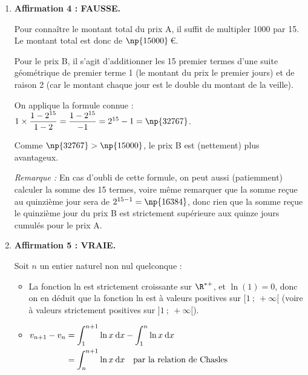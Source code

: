 \begin{enumerate}
	\begin{itemize}
		\item La première exécution \og modifie\fg{} \texttt{U} en \texttt{U + 0}, la valeur reste égale à 1;
		\item La deuxième exécution modifie \texttt{U} en \texttt{U + 1}, la valeur devient égale à $1 + 1 = 2$;
		\item La troisième exécution modifie \texttt{U} en \texttt{U + 2}, la valeur devient égale à $2 + 2 = 4$;
		\item La dernière exécution modifie \texttt{U} en \texttt{U + 3}, la valeur devient égale à $4 + 3 = 7$.
	\end{itemize}

	On a donc bien la valeur 7 renvoyée par cet appel.
	\item \textbf{Affirmation 4 : FAUSSE.}

	Pour connaître le montant total du prix A, il suffit de multipler 1000 par 15. Le montant total est donc de $\np{15000}$\,\euro{}.

	Pour le prix B, il s'agit d'additionner les 15 premier termes d'une suite géométrique de premier terme 1 (le montant du prix le premier jours) et de raison 2 (car le montant chaque jour est le double du montant de la veille).

	On applique la formule connue : \quad $1 \times \dfrac{1 - 2^{15}}{1 - 2} =\dfrac{1-2^{15}}{-1} = 2^{15} - 1 = \np{32767}$.

	Comme $\np{32767} > \np{15000}$, le prix B est (nettement) plus avantageux.

	\emph{Remarque :} En cas d'oubli de cette formule, on peut aussi (patiemment) calculer la somme des 15 termes, voire même remarquer que la somme reçue au quinzième jour sera de $2^{15 - 1} = \np{16384}$, donc rien que la somme reçue le quinzième jour du prix B est strictement supérieure aux quinze jours cumulés pour le prix A.

	\item \textbf{Affirmation 5 : VRAIE.}

	Soit $n$ un entier naturel non nul quelconque :

	\begin{itemize}
		\item La fonction ln est strictement croissante sur $\R^{*+}$, et $\ln(1) = 0$, donc on en déduit que la fonction ln est à valeurs positives sur $[1 ~;~ +\infty[$ (voire à valeurs strictement positives sur $]1~;~ +\infty[$).
		\item $\aligned[t] \displaystyle v_{n+1}	- v_n &= \int_{1}^{n+1} \ln x \:\mathrm{d} x - \int_{1}^{n} \ln x \:\mathrm{d} x \\
		&= \int_{n}^{n+1} \ln x \:\mathrm{d} x \quad\text{par la relation de Chasles} \endaligned$


\end{itemize}
\end{enumerate}
